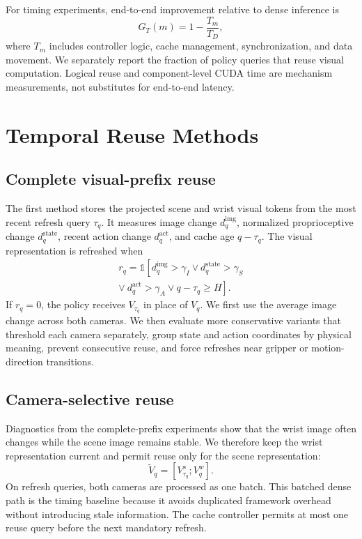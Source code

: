 \documentclass[journal]{IEEEtran}
\begin{document}
For timing experiments, end-to-end improvement relative to dense inference is
\begin{equation}
    G_T(m)=1-\frac{T_m}{T_D},
    \label{eq:speed}
\end{equation}
where $T_m$ includes controller logic, cache management, synchronization, and data movement. We separately report the fraction of policy queries that reuse visual computation. Logical reuse and component-level CUDA time are mechanism measurements, not substitutes for end-to-end latency.

\section{Temporal Reuse Methods}
\subsection{Complete visual-prefix reuse}
The first method stores the projected scene and wrist visual tokens from the most recent refresh query $\tau_q$. It measures image change $d_q^{\mathrm{img}}$, normalized proprioceptive change $d_q^{\mathrm{state}}$, recent action change $d_q^{\mathrm{act}}$, and cache age $q-\tau_q$. The visual representation is refreshed when
\begin{equation}
 \begin{split}
 r_q=\mathbb{1}\!\left[
 d_q^{\mathrm{img}}>\gamma_I \vee
 d_q^{\mathrm{state}}>\gamma_S \right.\\
 \left. \vee\ d_q^{\mathrm{act}}>\gamma_A \vee
 q-\tau_q\ge H
 \right].
 \end{split}
 \label{eq:refresh}
\end{equation}
If $r_q=0$, the policy receives $V_{\tau_q}$ in place of $V_q$. We first use the average image change across both cameras. We then evaluate more conservative variants that threshold each camera separately, group state and action coordinates by physical meaning, prevent consecutive reuse, and force refreshes near gripper or motion-direction transitions.

\subsection{Camera-selective reuse}
Diagnostics from the complete-prefix experiments show that the wrist image often changes while the scene image remains stable. We therefore keep the wrist representation current and permit reuse only for the scene representation:
\begin{equation}
    \widetilde V_q = \left[V_{\tau_q}^{s};V_q^{w}\right].
    \label{eq:camera}
\end{equation}
On refresh queries, both cameras are processed as one batch. This batched dense path is the timing baseline because it avoids duplicated framework overhead without introducing stale information. The cache controller permits at most one reuse query before the next mandatory refresh.
\end{document}

